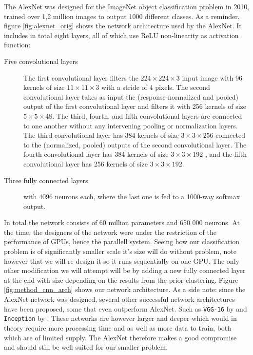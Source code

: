 The AlexNet was designed for the ImageNet object classification problem in 2010, trained over 1,2 million images to output 1000 different classes. As a reminder, figure \ref{fig:alexnet_orig} shows the network architecture used by the AlexNet. It includes in total eight layers, all of which use ReLU non-linearity as activation function:

\begin{description}

	\item[Five convolutional layers] The first convolutional layer filters the \(224 \times 224 \times 3\) input image with 96 kernels of size \(11 \times 11 \times 3\) with a stride of 4 pixels. The second convolutional layer takes as input the (response-normalized and pooled) output of the first convolutional layer and filters it with 256 kernels of size \(5 \times 5 \times 48\). The third, fourth, and fifth convolutional layers are connected to one another without any intervening pooling or normalization layers. The third convolutional layer has 384 kernels of size \(3 \times 3 \times 256\) connected to the (normalized, pooled) outputs of the second convolutional layer. The fourth convolutional layer has 384 kernels of size \(3 \times 3 \times 192\) , and the fifth convolutional layer has 256 kernels of size \(3 \times 3 \times 192\).

	\item[Three fully connected layers] with 4096 neurons each, where the last one is fed to a 1000-way softmax output.

\end{description}

In total the network consists of 60 million parameters and 650 000 neurons. At the time, the designers of the network were under the restriction of the performance of GPUs, hence the parallell system. Seeing how our classification problem is of significantly smaller scale it's size will do without problem, note however that we will re-design it so it runs sequentially on one GPU. The only other modification we will attempt will be by adding a new fully connected layer at the end with size depending on the results from the prior clustering. Figure \ref{fig:method_cnn_arch} shows our network architecture. As a side note: since the AlexNet network was designed, several other successful network architectures have been proposed, some that even outperform AlexNet. Such as \texttt{VGG-16} by \textcite{Arge2015} and \texttt{Inception} by \textcite{Szegedy2014}. These networks are however larger and deeper which would in theory require more processing time and as well as more data to train, both which are of limited supply. The AlexNet therefore makes a good compromise and should still be well suited for our smaller problem.

